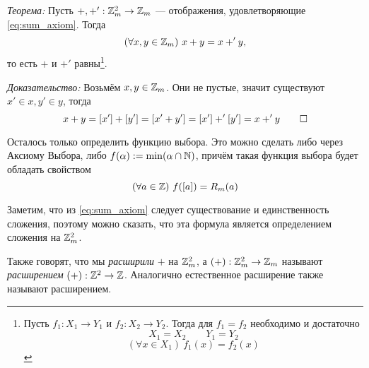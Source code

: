 \vspace{1em}
{\it Теорема:} Пусть $+,+':\mathbb Z_{m}^{2}\to\mathbb Z_{m}$ --- отображения,
удовлетворяющие \eqref{eq:sum_axiom}. Тогда
\[
  (\forall x,y\in\mathbb Z_{m})~x+y=x+'y,
\]
то есть $+$ и $+'$ равны\footnote{Пусть $f_1:X_1\to Y_1$ и $f_2:X_2\to Y_2$.
  Тогда для $f_1=f_2$ необходимо и достаточно
  \[
    X_1=X_2\qquad Y_1=Y_2
  \]
  \[
    (\forall x\in X_1)~f_1(x)=f_2(x)
  \]
}.

{\it Доказательство:} Возьмём $x,y\in\mathbb Z_{m}$. Они не пустые, значит
существуют $x'\in x,y'\in y$, тогда
\[
  x+y=[x']+[y']=[x'+y']=[x']+'[y']=x+'y\qed
\]

Осталось только определить функцию выбора. Это можно сделать либо через
Аксиому Выбора, либо $f(\alpha):=\min(\alpha\cap\mathbb N)$, причём такая функция
выбора будет обладать свойством
\[
  (\forall a\in\mathbb Z)~f([a])=R_{m}(a)
\]

Заметим, что из \eqref{eq:sum_axiom} следует существование
и единственность сложения, поэтому можно сказать,
что эта формула является определением сложения на $\mathbb Z_{m}^{2}$.

Также говорят, что мы {\it расширили} $+$ на $\mathbb Z_{m}^{2}$,
а $(+):\mathbb Z_{m}^{2}\to\mathbb Z_{m}$ называют {\it расширением} $(+):\mathbb Z^{2}\to\mathbb Z$.
Аналогично естественное расширение также называют расширением.

